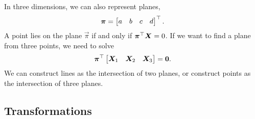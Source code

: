 In three dimensions, we can also represent planes, \[
  \bm{\pi} = \begin{bmatrix} a & b & c & d \end{bmatrix}^\top
.\]
A point lies on the plane $\vec{\pi}$ if and only if $\bm{\pi}^\top
\bm{X}=0$.  If we want to find a plane from three points, we need to solve \[
  \bm{\pi}^\top \begin{bmatrix} \bm{X}_1 & \bm{X}_2 & \bm{X}_3 \end{bmatrix} = \bm{0}
.\]
We can construct lines as the intersection of two planes, or construct
points as the intersection of three planes.

\subsection{Transformations}

